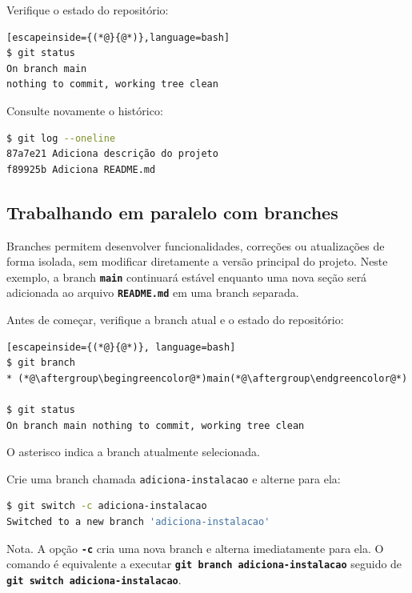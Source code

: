 \documentclass[12pt,a4paper]{article}
\begin{document}
Verifique o estado do repositório:

\begin{lstlisting}[escapeinside={(*@}{@*)},language=bash]
$ git status
On branch main
nothing to commit, working tree clean
\end{lstlisting}

Consulte novamente o histórico:

\begin{lstlisting}[language=bash]
$ git log --oneline
87a7e21 Adiciona descrição do projeto
f89925b Adiciona README.md
\end{lstlisting}

\subsection{Trabalhando em paralelo com branches}

Branches permitem desenvolver funcionalidades, correções ou atualizações de forma isolada, sem modificar diretamente a versão principal do projeto. Neste exemplo, a branch \textbf{\texttt{main}} continuará estável enquanto uma nova seção será adicionada ao arquivo \textbf{\texttt{README.md}} em uma branch separada.

Antes de começar, verifique a branch atual e o estado do repositório:

\begin{lstlisting}[escapeinside={(*@}{@*)}, language=bash]
$ git branch
* (*@\aftergroup\begingreencolor@*)main(*@\aftergroup\endgreencolor@*)

$ git status
On branch main nothing to commit, working tree clean
\end{lstlisting}

O asterisco indica a branch atualmente selecionada. 

Crie uma branch chamada \texttt{adiciona-instalacao} e alterne para ela:

\begin{lstlisting}[language=bash]
$ git switch -c adiciona-instalacao
Switched to a new branch 'adiciona-instalacao'
\end{lstlisting}

\begin{question}{Nota.}
\footnotesize A opção \textbf{\texttt{-c}} cria uma nova branch e alterna imediatamente para ela. 
O comando é equivalente a executar \textbf{\texttt{git branch adiciona-instalacao}} seguido de \textbf{\texttt{git switch adiciona-instalacao}}.
\end{question}
\end{document}
